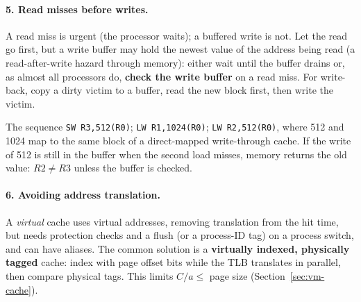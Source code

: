 \paragraph{5. Read misses before writes.} A read miss is urgent (the processor
waits); a buffered write is not. Let the read go first, but a write buffer may hold
the newest value of the address being read (a read-after-write hazard through
memory): either wait until the buffer drains or, as almost all processors do,
\textbf{check the write buffer} on a read miss. For write-back, copy a dirty victim
to a buffer, read the new block first, then write the victim.
\begin{eg}
The sequence \texttt{SW R3,512(R0)}; \texttt{LW R1,1024(R0)};
\texttt{LW R2,512(R0)}, where 512 and 1024 map to the same block of a direct-mapped write-through cache. If the
write of 512 is still in the buffer when the second load misses, memory returns
the old value: $R2\ne R3$ unless the buffer is checked.
\end{eg}

\paragraph{6. Avoiding address translation.} A \emph{virtual} cache uses virtual
addresses, removing translation from the hit time, but needs protection checks and
a flush (or a process-ID tag) on a process switch, and can have aliases. The common
solution is a \textbf{virtually indexed, physically tagged} cache: index with page
offset bits while the TLB translates in parallel, then compare physical tags. This
limits $C/a\le$ page size (Section~\ref{sec:vm-cache}).

